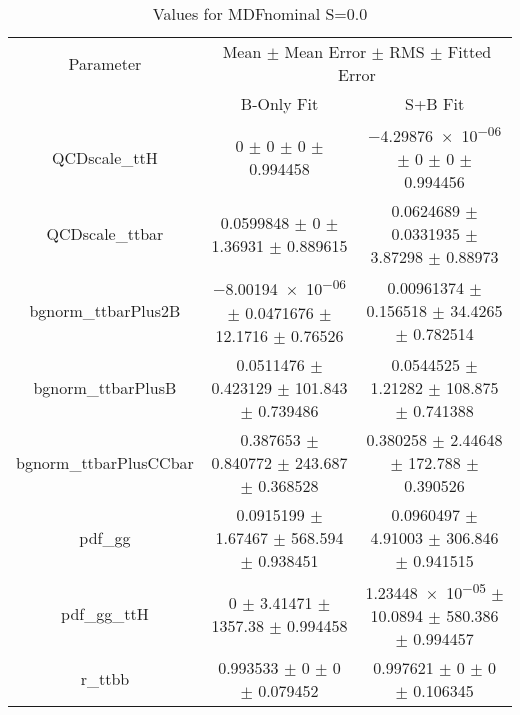 \begin{table}
\centering
\caption{Values for MDFnominal S=0.0}
\begin{tabular}{ccc}
\toprule
Parameter & \multicolumn{2}{c}{Mean $\pm$ Mean Error $\pm$ RMS $\pm$ Fitted Error}\\
 & B-Only Fit & S+B Fit\\
\midrule
QCDscale\_ttH & \num{0} $\pm$ \num{0} $\pm$ \num{0} $\pm$ \num{0.994458} & \num{-4.29876e-06} $\pm$ \num{0} $\pm$ \num{0} $\pm$ \num{0.994456}\\
QCDscale\_ttbar & \num{0.0599848} $\pm$ \num{0} $\pm$ \num{1.36931} $\pm$ \num{0.889615} & \num{0.0624689} $\pm$ \num{0.0331935} $\pm$ \num{3.87298} $\pm$ \num{0.88973}\\
bgnorm\_ttbarPlus2B & \num{-8.00194e-06} $\pm$ \num{0.0471676} $\pm$ \num{12.1716} $\pm$ \num{0.76526} & \num{0.00961374} $\pm$ \num{0.156518} $\pm$ \num{34.4265} $\pm$ \num{0.782514}\\
bgnorm\_ttbarPlusB & \num{0.0511476} $\pm$ \num{0.423129} $\pm$ \num{101.843} $\pm$ \num{0.739486} & \num{0.0544525} $\pm$ \num{1.21282} $\pm$ \num{108.875} $\pm$ \num{0.741388}\\
bgnorm\_ttbarPlusCCbar & \num{0.387653} $\pm$ \num{0.840772} $\pm$ \num{243.687} $\pm$ \num{0.368528} & \num{0.380258} $\pm$ \num{2.44648} $\pm$ \num{172.788} $\pm$ \num{0.390526}\\
pdf\_gg & \num{0.0915199} $\pm$ \num{1.67467} $\pm$ \num{568.594} $\pm$ \num{0.938451} & \num{0.0960497} $\pm$ \num{4.91003} $\pm$ \num{306.846} $\pm$ \num{0.941515}\\
pdf\_gg\_ttH & \num{0} $\pm$ \num{3.41471} $\pm$ \num{1357.38} $\pm$ \num{0.994458} & \num{1.23448e-05} $\pm$ \num{10.0894} $\pm$ \num{580.386} $\pm$ \num{0.994457}\\
r\_ttbb & \num{0.993533} $\pm$ \num{0} $\pm$ \num{0} $\pm$ \num{0.079452} & \num{0.997621} $\pm$ \num{0} $\pm$ \num{0} $\pm$ \num{0.106345}\\
\bottomrule
\end{tabular}
\end{table}
